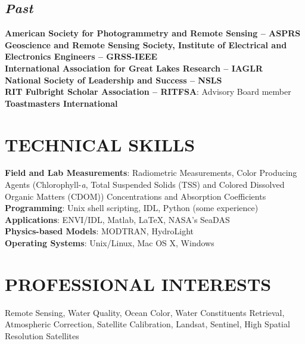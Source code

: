 \documentclass[11pt]{res} %
\begin{document}
\begin{resume}
\subsection{\it Past}
\vspace{-0.2in}
{\bf American Society for Photogrammetry and Remote Sensing -- ASPRS}
\vspace{0.1in}\\
{\bf Geoscience and Remote Sensing Society, Institute of Electrical and Electronics Engineers -- GRSS-IEEE}
\vspace{0.1in}\\
{\bf International Association for Great Lakes Research -- IAGLR}
\vspace{0.1in}\\
{\bf National Society of Leadership and Success -- NSLS}
\vspace{0.1in}\\
{\bf RIT Fulbright Scholar Association -- RITFSA}: Advisory Board member
\vspace{0.1in}\\
{\bf Toastmasters International}

\section{TECHNICAL SKILLS}
\vspace{0.1in}
{\bf Field and Lab Measurements}: Radiometric Measurements, Color Producing Agents (Chlorophyll-{\it a}, Total Suspended Solids (TSS) and Colored Dissolved Organic Matters (CDOM)) Concentrations and Absorption Coefficients
\vspace{0.1in}\\
{\bf Programming}: Unix shell scripting, IDL, Python (some experience)
\vspace{0.1in}\\
{\bf Applications}: ENVI/IDL, Matlab, LaTeX, NASA's SeaDAS
\vspace{0.1in}\\
{\bf Physics-based Models}: MODTRAN, HydroLight
\vspace{0.1in}\\
{\bf Operating Systems}: Unix/Linux, Mac OS X, Windows\\

\vspace{-0.1in}
\section{PROFESSIONAL INTERESTS}
\vspace{0.1in}
Remote Sensing, Water Quality, Ocean Color, Water Constituents Retrieval, Atmospheric Correction, Satellite Calibration, Landsat, Sentinel, High Spatial Resolution Satellites\\


\end{resume}
\end{document}
